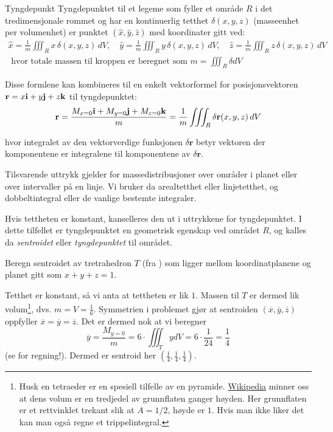 \begin{defn}{Tyngdepunkt}
Tyngdepunktet til et legeme som fyller et område \( R \) i det tredimensjonale rommet og har en kontinuerlig tetthet \( \delta(x, y, z) \) (masseenhet per volumenhet) er punktet \( (\hat{x}, \hat{y}, \hat{z}) \) med koordinater gitt ved:
\begin{align*}
\hat{x} = \frac{1}{m} \iiint_R x \, \delta(x, y, z)\, dV, \quad
\hat{y} = \frac{1}{m} \iiint_R y \, \delta(x, y, z)\, dV, \quad
\hat{z} = \frac{1}{m} \iiint_R z \, \delta(x, y, z)\, dV\\
\text{ hvor totale massen til kroppen er beregnet som }m = \iiint_R \delta dV
\end{align*}
\end{defn}
Disse formlene kan kombineres til en enkelt vektorformel for posisjonsvektoren \( \mathbf{r} = x\mathbf{i} + y\mathbf{j} + z\mathbf{k} \) til tyngdepunktet:
\[
\mathbf{r} = \frac{M_{x=0}\mathbf{i}+M_{y=0}\mathbf{j}+M_{z=0}\mathbf{k}}{m}=\frac{1}{m} \iiint_R \delta\mathbf{r}(x, y, z)\, dV
\]

hvor integralet av den vektorverdige funksjonen \( \delta \mathbf{r} \) betyr vektoren der komponentene er integralene til komponentene av \( \delta \mathbf{r} \).

\begin{rem}{}
Tilsvarende uttrykk gjelder for massedistribusjoner over områder i planet eller over intervaller på en linje. Vi bruker da arealtetthet eller linjetetthet, og dobbeltintegral eller de vanlige bestemte integraler.

Hvis tettheten er konstant, kanselleres den ut i uttrykkene for tyngdepunktet. I dette tilfellet er tyngdepunktet en geometrisk egenskap ved området \( R \), og kalles da \emph{sentroidet} eller \emph{tyngdepunktet} til området. 
\end{rem}

\begin{eks}{}
Beregn sentroidet av tretrahedron $T$ (fra ) som ligger mellom koordinatplanene og planet gitt som $x+y+z=1$. 

Tetthet er konstant, så vi anta at tettheten er lik $1$. Massen til $T$ er dermed lik volum\footnote{Husk en tetraeder er en spesiell tilfelle av en pyramide. \href{https://no.wikipedia.org/wiki/Pyramide}{Wikipedia} minner oss at dens volum er en tredjedel av grunnflaten ganger høyden. Her grunnflaten er et rettvinklet trekant slik at $A=1/2$, høyde er $1$. Hvis man ikke liker det kan man også regne et trippelintegral.}, dvs. $m=V=\frac{1}{6}$. Symmetrien i problemet gjør at sentroiden $(\overline{x},\overline{y},\overline{z})$ oppfyller $\overline{x}=\overline{y}=\overline{z}$. Det er dermed nok at vi beregner 
\[\overline{y}=\frac{M_{y=0}}{m} = 6 \cdot \iiint_T y dV = 6 \cdot \frac{1}{24} =  \frac{1}{4}\]
(se  for regning!). Dermed er sentroid her $(\tfrac{1}{4},\tfrac{1}{4},\tfrac{1}{4})$.
\end{eks}

